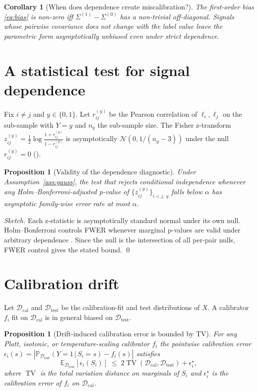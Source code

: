\documentclass[11pt]{article}
\newtheorem{proposition}[theorem]{Proposition}
\newtheorem{corollary}[theorem]{Corollary}
\theoremstyle{definition}
\theoremstyle{remark}
\newcommand{\pr}{\mathbb{P}}
\newcommand{\expec}{\mathbb{E}}
\newcommand{\given}{\,\big|\,}
\begin{document}
\begin{corollary}[When does dependence create miscalibration?]\label{cor:matter}
The first-order bias \eqref{eq:bias} is non-zero iff
$\Sigma^{(1)} - \Sigma^{(0)}$ has a non-trivial off-diagonal. Signals whose
pairwise covariance does not change with the label value leave the
parametric form asymptotically unbiased even under strict dependence.
\end{corollary}

\section{A statistical test for signal dependence}

Fix $i \neq j$ and $y \in \{0,1\}$. Let $r^{(y)}_{ij}$ be the Pearson
correlation of $\ell_i, \ell_j$ on the sub-sample with $Y = y$ and
$n_y$ the sub-sample size. The Fisher z-transform
$z^{(y)}_{ij} = \tfrac{1}{2}\log \tfrac{1 + r^{(y)}_{ij}}{1 - r^{(y)}_{ij}}$
is asymptotically $\mathcal{N}(0, 1/(n_y - 3))$ under the null
$r^{(y)}_{ij} = 0$ (\citealt{fisher1915frequency}).

\begin{proposition}[Validity of the dependence diagnostic]
Under Assumption~\ref{ass:gauss}, the test that rejects conditional
independence whenever any Holm--Bonferroni-adjusted p-value of
$\{z^{(y)}_{ij}\}_{i < j,\,y}$ falls below $\alpha$ has asymptotic
family-wise error rate at most $\alpha$.
\end{proposition}

\begin{proof}[Sketch]
Each z-statistic is asymptotically standard normal under its own null.
Holm--Bonferroni controls FWER whenever marginal p-values are valid under
arbitrary dependence \citep{holm1979simple}. Since the null is the
intersection of all per-pair nulls, FWER control gives the stated bound. \qed
\end{proof}

\section{Calibration drift}

Let $\mathcal{D}_{\mathrm{cal}}$ and $\mathcal{D}_{\mathrm{test}}$ be the
calibration-fit and test distributions of $X$. A calibrator $f_i$ fit on
$\mathcal{D}_{\mathrm{cal}}$ is in general biased on
$\mathcal{D}_{\mathrm{test}}$.

\begin{proposition}[Drift-induced calibration error is bounded by TV]
For any Platt, isotonic, or temperature-scaling calibrator $f_i$ the
pointwise calibration error
$\epsilon_i(s) = |\pr_{\mathcal{D}_{\mathrm{test}}}(Y=1 \given S_i=s) - f_i(s)|$
satisfies
\[
  \expec_{\mathcal{D}_{\mathrm{test}}}[\epsilon_i(S_i)]
  \;\leq\;
  2 \operatorname{TV}(\mathcal{D}_{\mathrm{cal}}, \mathcal{D}_{\mathrm{test}}) + \epsilon^{\star}_i,
\]
where $\operatorname{TV}$ is the total variation distance on marginals of
$S_i$ and $\epsilon^\star_i$ is the calibration error of $f_i$ on
$\mathcal{D}_{\mathrm{cal}}$.
\end{proposition}
\end{document}
